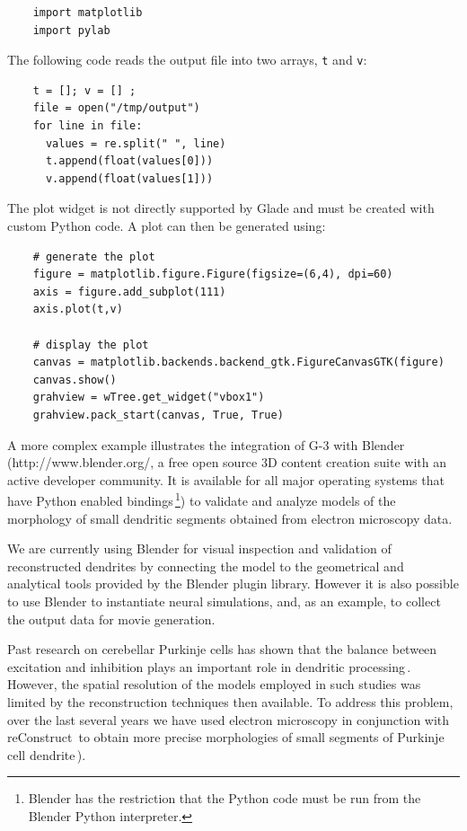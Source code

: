 \documentclass[10pt]{article}
\begin{document}
\begin{verbatim}
    import matplotlib
    import pylab
\end{verbatim}

The following code reads the output file into two arrays, {\tt t} and
{\tt v}:

\begin{verbatim}
    t = []; v = [] ;
    file = open("/tmp/output")
    for line in file:
      values = re.split(" ", line)
      t.append(float(values[0]))
      v.append(float(values[1]))
\end{verbatim}

The plot widget is not directly supported by Glade and must be created
with custom Python code.  A plot can then be generated using:

\begin{verbatim}
    # generate the plot
    figure = matplotlib.figure.Figure(figsize=(6,4), dpi=60)
    axis = figure.add_subplot(111)
    axis.plot(t,v)

    # display the plot
    canvas = matplotlib.backends.backend_gtk.FigureCanvasGTK(figure)
    canvas.show()
    grahview = wTree.get_widget("vbox1")
    grahview.pack_start(canvas, True, True)
\end{verbatim}

A more complex example illustrates the integration of G-3 with Blender
(http://www.blender.org/, a free open source 3D content creation suite
with an active developer community. It is available for all major
operating systems that have Python enabled bindings\,\footnote{Blender
  has the restriction that the Python code must be run from the
  Blender Python interpreter.}) to validate and analyze models of the
morphology of small dendritic segments obtained from electron
microscopy data.

We are currently using Blender for visual inspection and validation of
reconstructed dendrites by connecting the model to the geometrical and
analytical tools provided by the Blender plugin library.  However it
is also possible to use Blender to instantiate neural simulations,
and, as an example, to collect the output data for movie generation.

Past research on cerebellar Purkinje cells has shown
that the balance between excitation and inhibition plays an important
role in dendritic
processing\,\cite{santamaria02:_modul_purkin, mittmann07:_linkin_purkin}.
However, the spatial resolution of the models employed in such studies
was limited by the reconstruction techniques then available.
To address this problem, over the last several years we have used electron
microscopy in conjunction with reConstruct\,\cite{jc05:_recon}
to obtain more precise morphologies of small segments of Purkinje cell
dendrite\,\cite{cornelis08:_model_neuros_genes}).\\
\end{document}
